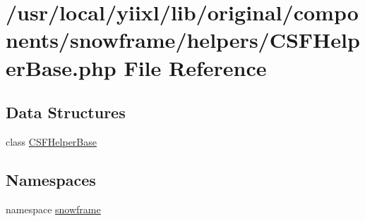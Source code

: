 \hypertarget{CSFHelperBase_8php}{
\section{/usr/local/yiixl/lib/original/components/snowframe/helpers/CSFHelperBase.php File Reference}
\label{CSFHelperBase_8php}
}
\subsection*{Data Structures}
\begin{DoxyCompactItemize}
\item 
class \hyperlink{classCSFHelperBase}{CSFHelperBase}
\end{DoxyCompactItemize}
\subsection*{Namespaces}
\begin{DoxyCompactItemize}
\item 
namespace \hyperlink{namespacesnowframe}{snowframe}
\end{DoxyCompactItemize}
